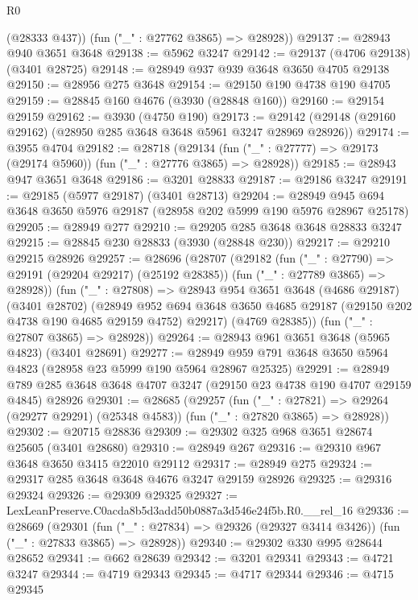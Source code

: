 \begin{lexlean}{R0}
\begin{coremodule}
        (@28333 @437))
      (fun ("_" : @27762 @3865) => @28928))
@29137 := @28943 @940 @3651 @3648
@29138 := @5962 @3247
@29142 := @29137 (@4706 @29138) (@3401 @28725)
@29148 := @28949 @937 @939 @3648 @3650 @4705 @29138
@29150 := @28956 @275 @3648
@29154 := @29150 @190 @4738 @190 @4705
@29159 := @28845 @160 @4676 (@3930 (@28848 @160))
@29160 := @29154 @29159
@29162 := @3930 (@4750 @190)
@29173 := @29142 (@29148 (@29160 @29162) (@28950 @285 @3648 @3648 @5961 @3247 @28969 @28926))
@29174 := @3955 @4704
@29182 := @28718
    (@29134 (fun ("_" : @27777) => @29173 (@29174 @5960)) (fun ("_" : @27776 @3865) => @28928))
@29185 := @28943 @947 @3651 @3648
@29186 := @3201 @28833
@29187 := @29186 @3247
@29191 := @29185 (@5977 @29187) (@3401 @28713)
@29204 := @28949 @945 @694 @3648 @3650 @5976 @29187 (@28958 @202 @5999 @190 @5976 @28967 @25178)
@29205 := @28949 @277
@29210 := @29205 @285 @3648 @3648 @28833 @3247
@29215 := @28845 @230 @28833 (@3930 (@28848 @230))
@29217 := @29210 @29215 @28926
@29257 := @28696
    (@28707
      (@29182
        (fun ("_" : @27790) => @29191 (@29204 @29217) (@25192 @28385))
        (fun ("_" : @27789 @3865) => @28928))
      (fun ("_" : @27808) =>
      @28943
        @954
        @3651
        @3648
        (@4686 @29187)
        (@3401 @28702)
        (@28949
          @952
          @694
          @3648
          @3650
          @4685
          @29187
          (@29150 @202 @4738 @190 @4685 @29159 @4752)
          @29217)
        (@4769 @28385))
      (fun ("_" : @27807 @3865) => @28928))
@29264 := @28943 @961 @3651 @3648 (@5965 @4823) (@3401 @28691)
@29277 := @28949 @959 @791 @3648 @3650 @5964 @4823 (@28958 @23 @5999 @190 @5964 @28967 @25325)
@29291 := @28949 @789 @285 @3648 @3648 @4707 @3247 (@29150 @23 @4738 @190 @4707 @29159 @4845) @28926
@29301 := @28685
    (@29257
      (fun ("_" : @27821) => @29264 (@29277 @29291) (@25348 @4583))
      (fun ("_" : @27820 @3865) => @28928))
@29302 := @20715 @28836
@29309 := @29302 @325 @968 @3651 @28674 @25605 (@3401 @28680)
@29310 := @28949 @267
@29316 := @29310 @967 @3648 @3650 @3415 @22010 @29112
@29317 := @28949 @275
@29324 := @29317 @285 @3648 @3648 @4676 @3247 @29159 @28926
@29325 := @29316 @29324
@29326 := @29309 @29325
@29327 := LexLeanPreserve.C0acda8b5d3add50b0887a3d546e24f5b.R0.__rel_16
@29336 := @28669
    (@29301
      (fun ("_" : @27834) => @29326 (@29327 @3414 @3426))
      (fun ("_" : @27833 @3865) => @28928))
@29340 := @29302 @330 @995 @28644 @28652
@29341 := @662 @28639
@29342 := @3201 @29341
@29343 := @4721 @3247
@29344 := @4719 @29343
@29345 := @4717 @29344
@29346 := @4715 @29345

\end{coremodule}
\end{lexlean}
